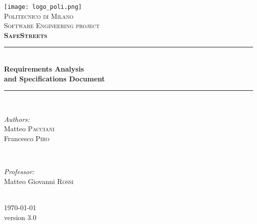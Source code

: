 \begin{titlepage}
	
\newcommand{\HRule}{\rule{\linewidth}{0.5mm}}
\centering

\texttt{[image: logo\_poli.png]}\\[0.5cm]
\textsc{\LARGE Politecnico di Milano}\\[2cm]
\textsc{\Large Software Engineering  project}\\[0.5cm]
\textsc{\LARGE \textbf{SafeStreets}}\\[1.5cm]

\HRule \\[0.4cm]
{ \huge \bfseries Requirements Analysis\\ and Specifications Document}\\[0.4cm] %
\HRule \\[1.5cm]

\begin{minipage}{0.4\textwidth}
	\begin{flushleft} \large
		\emph{Authors:}\\
		Matteo \textsc{Pacciani}\\
		Francesco \textsc{Piro}\\
	\end{flushleft}
\end{minipage}
~
\begin{minipage}{0.4\textwidth}
	\begin{flushright} \large
		\emph{Professor:} \\
		Matteo Giovanni \textsc{Rossi} %
	\end{flushright}
\end{minipage}\\[2cm]

{\large \today}\\[0.5cm] %
{\large version 3.0}\\[2cm]

\vfill
\clearpage

\end{titlepage}
